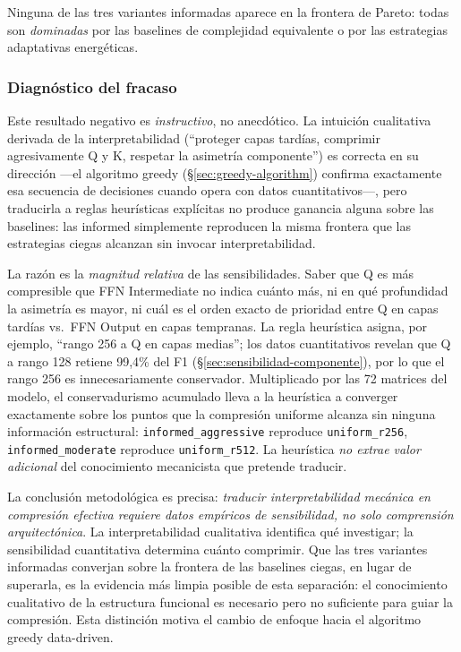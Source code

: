 Ninguna de las tres variantes informadas aparece en la frontera de Pareto:
todas son \emph{dominadas} por las baselines de complejidad equivalente o
por las estrategias adaptativas energéticas.

\subsubsection{Diagnóstico del fracaso}

Este resultado negativo es \emph{instructivo}, no anecdótico. La intuición
cualitativa derivada de la interpretabilidad (``proteger capas tardías,
comprimir agresivamente Q y K, respetar la asimetría componente'') es
correcta en su dirección ---el algoritmo greedy
(\S\ref{sec:greedy-algorithm}) confirma exactamente esa secuencia de
decisiones cuando opera con datos cuantitativos---, pero traducirla a
reglas heurísticas explícitas no produce ganancia alguna sobre las
baselines: las informed simplemente reproducen la misma frontera que las
estrategias ciegas alcanzan sin invocar interpretabilidad.

La razón es la \emph{magnitud relativa} de las sensibilidades. Saber que
Q es más compresible que FFN Intermediate no indica cuánto más, ni en
qué profundidad la asimetría es mayor, ni cuál es el orden exacto de
prioridad entre Q en capas tardías vs.\ FFN Output en capas tempranas. La
regla heurística asigna, por ejemplo, ``rango 256 a Q en capas medias'';
los datos cuantitativos revelan que Q a rango 128 retiene 99{,}4\% del
F1 (\S\ref{sec:sensibilidad-componente}), por lo que el rango 256 es
innecesariamente conservador. Multiplicado por las 72 matrices del modelo,
el conservadurismo acumulado lleva a la heurística a converger
exactamente sobre los puntos que la compresión uniforme alcanza sin
ninguna información estructural: \texttt{informed\_aggressive} reproduce
\texttt{uniform\_r256}, \texttt{informed\_moderate} reproduce
\texttt{uniform\_r512}. La heurística \emph{no extrae valor adicional}
del conocimiento mecanicista que pretende traducir.

La conclusión metodológica es precisa: \emph{traducir interpretabilidad
mecánica en compresión efectiva requiere datos empíricos de sensibilidad,
no solo comprensión arquitectónica}. La interpretabilidad cualitativa
identifica qué investigar; la sensibilidad cuantitativa determina cuánto
comprimir. Que las tres variantes informadas converjan sobre la frontera
de las baselines ciegas, en lugar de superarla, es la evidencia más
limpia posible de esta separación: el conocimiento cualitativo de la
estructura funcional es necesario pero no suficiente para guiar la
compresión. Esta distinción motiva el cambio de enfoque hacia el
algoritmo greedy data-driven.


